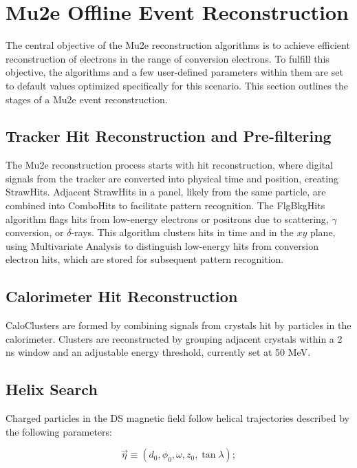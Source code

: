 
\chapter{Mu2e Offline Event Reconstruction}\label{eventreco}

The central objective of the Mu2e reconstruction algorithms is to achieve efficient 
reconstruction of electrons in the range of conversion electrons. To fulfill this objective, 
the algorithms and a few user-defined parameters within them are set to default values optimized 
specifically for this scenario. This section outlines the stages of a Mu2e event reconstruction.

\section{Tracker Hit Reconstruction and Pre-filtering}

The Mu2e reconstruction process starts with hit reconstruction, where digital signals from the 
tracker are converted into physical time and position, creating StrawHits. Adjacent StrawHits in 
a panel, likely from the same particle, are combined into ComboHits to facilitate pattern recognition. 
The FlgBkgHits algorithm flags hits from low-energy electrons or positrons due to scattering, $\gamma$ 
conversion, or $\delta$-rays. This algorithm clusters hits in time and in the $xy$ plane, using 
Multivariate Analysis to distinguish low-energy hits from conversion electron hits, which are stored for subsequent pattern recognition.

\section{Calorimeter Hit Reconstruction}

CaloClusters are formed by combining signals from crystals hit by particles 
in the calorimeter. Clusters are reconstructed by grouping adjacent crystals 
within a 2 ns window and an adjustable energy threshold, currently set at 50 MeV.

\section{Helix Search}

Charged particles in the DS magnetic field follow helical trajectories described 
by the following parameters:

\[
\vec{\eta} \equiv (d_0, \phi_0, \omega, z_0, \tan \lambda);
\]

